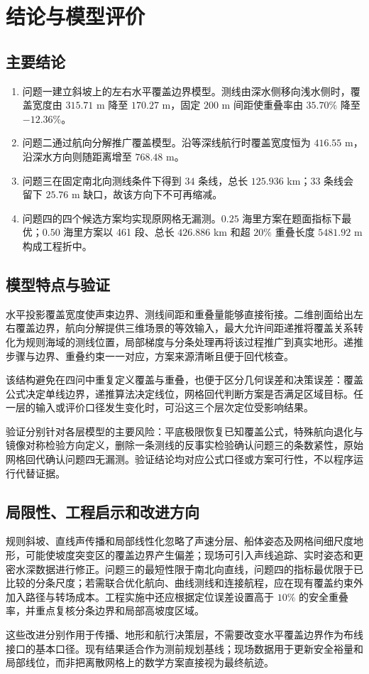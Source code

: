 \section{结论与模型评价}

\subsection{主要结论}

\begin{enumerate}
  \item 问题一建立斜坡上的左右水平覆盖边界模型。测线由深水侧移向浅水侧时，覆盖宽度由 $315.71$ m 降至 $170.27$ m，固定 $200$ m 间距使重叠率由 $35.70\%$ 降至 $-12.36\%$。
  \item 问题二通过航向分解推广覆盖模型。沿等深线航行时覆盖宽度恒为 $416.55$ m，沿深水方向则随距离增至 $768.48$ m。
  \item 问题三在固定南北向测线条件下得到 $34$ 条线，总长 $125.936$ km；33 条线会留下 $25.76$ m 缺口，故该方向下不可再缩减。
  \item 问题四的四个候选方案均实现原网格无漏测。$0.25$ 海里方案在题面指标下最优；$0.50$ 海里方案以 461 段、总长 $426.886$ km 和超 $20\%$ 重叠长度 $5481.92$ m 构成工程折中。
\end{enumerate}

\subsection{模型特点与验证}

水平投影覆盖宽度使声束边界、测线间距和重叠量能够直接衔接。二维剖面给出左右覆盖边界，航向分解提供三维场景的等效输入，最大允许间距递推将覆盖关系转化为规则海域的测线位置，局部梯度与分条处理再将该过程推广到真实地形。递推步骤与边界、重叠约束一一对应，方案来源清晰且便于回代核查。

该结构避免在四问中重复定义覆盖与重叠，也便于区分几何误差和决策误差：覆盖公式决定单线边界，递推算法决定线位，网格回代判断方案是否满足区域目标。任一层的输入或评价口径发生变化时，可沿这三个层次定位受影响结果。

验证分别针对各层模型的主要风险：平底极限恢复已知覆盖公式，特殊航向退化与镜像对称检验方向定义，删除一条测线的反事实检验确认问题三的条数紧性，原始网格回代确认问题四无漏测。验证结论均对应公式口径或方案可行性，不以程序运行代替证据。

\subsection{局限性、工程启示和改进方向}

规则斜坡、直线声传播和局部线性化忽略了声速分层、船体姿态及网格间细尺度地形，可能使坡度突变区的覆盖边界产生偏差；现场可引入声线追踪\cite{ref_book}、实时姿态和更密水深数据进行修正。问题三的最短性限于南北向直线，问题四的指标最优限于已比较的分条尺度；若需联合优化航向、曲线测线和连接航程，应在现有覆盖约束外加入路径与转场成本。工程实施中还应根据定位误差设置高于 $10\%$ 的安全重叠率，并重点复核分条边界和局部高坡度区域。

这些改进分别作用于传播、地形和航行决策层，不需要改变水平覆盖边界作为布线接口的基本口径。现有结果适合作为测前规划基线；现场数据用于更新安全裕量和局部线位，而非把离散网格上的数学方案直接视为最终航迹。
